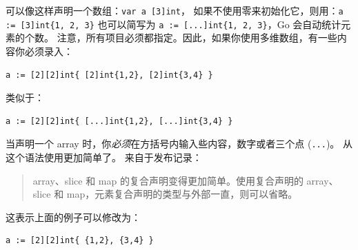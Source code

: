 可以像这样声明一个数组：\lstinline{var a [3]int}，
如果不使用零来初始化它，则用：\lstinline|a := [3]int{1, 2, 3}| 也可以简写为
\lstinline|a := [...]int{1, 2, 3}|，Go 会自动统计元素的个数。
注意，所有项目必须都指定。因此，如果你使用多维数组，有一些内容你必须录入：
\begin{lstlisting}
a := [2][2]int{ [2]int{1,2}, [2]int{3,4} }
\end{lstlisting}
类似于：
\begin{lstlisting}
a := [2][2]int{ [...]int{1,2}, [...]int{3,4} }
\end{lstlisting}
当声明一个 array 时，你\emph{必须}在方括号内输入些内容，数字或者三个点
(\verb|...|)。%
从 \cite{go_release_hist} 这个语法使用更加简单了。
来自于发布记录：
\begin{quote}
array、slice 和 map 的复合声明变得更加简单。使用复合声明的
array、slice 和 map，元素复合声明的类型与外部一直，则可以省略。
\end{quote}
这表示上面的例子可以修改为：
\begin{lstlisting}
a := [2][2]int{ {1,2}, {3,4} }
\end{lstlisting}

